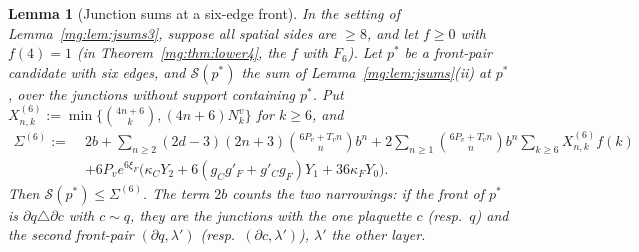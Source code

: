 \documentclass[11pt,a4paper]{article}
\newtheorem{lemma}[theorem]{Lemma}
\theoremstyle{definition}
\theoremstyle{remark}
\begin{document}
\begin{lemma}[Junction sums at a six-edge front]\label{mg:lem:jsums6}
In the setting of Lemma~\ref{mg:lem:jsums3}, suppose all spatial sides are $\ge8$, and let $f\ge0$ with $f(4)=1$ (in Theorem~\ref{mg:thm:lower4}, the $f$ with
$F_6$). Let $p^*$ be a front-pair candidate with six edges, and $\mathcal S(p^*)$ the sum of Lemma~\ref{mg:lem:jsums}(ii) at $p^*$, over the junctions without support
containing $p^*$. Put $X^{(6)}_{n,k}:=\min\{\binom{4n+6}k,(4n+6)N^v_k\}$ for $k\ge6$, and
\begin{align*}
\Sigma^{(6)}:=\;&2b+\sum_{n\ge2}(2d-3)(2n+3)\binom{6P_v+T_vn}{n}b^n+2\sum_{n\ge1}\binom{6P_v+T_vn}{n}b^n\sum_{k\ge6}X^{(6)}_{n,k}f(k)\\
&+6P_ve^{6\xi_F}\bigl(\kappa_CY_2+6(g_Cg'_F+g'_Cg_F)Y_1+36\kappa_FY_0\bigr).
\end{align*}
Then $\mathcal S(p^*)\le\Sigma^{(6)}$. The term $2b$ counts the two \emph{narrowings}: if the front of $p^*$ is $\partial q\triangle\partial c$ with $c\sim q$, they are
the junctions with the one plaquette $c$ (resp.\ $q$) and the second front-pair $(\partial q,\lambda')$ (resp.\ $(\partial c,\lambda')$), $\lambda'$ the other layer.
\end{lemma}
\end{document}
